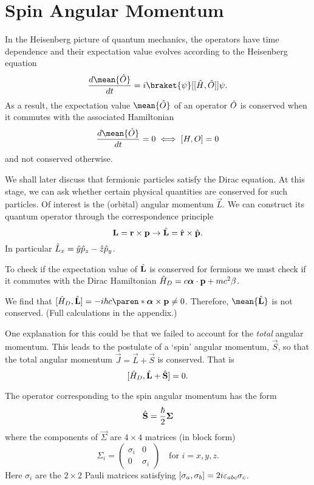 \documentclass[11pt]{penrose}
\begin{document}
\section{Spin Angular Momentum}
In the Heisenberg picture of quantum mechanics, the operators have time dependence and their expectation value evolves according to the Heisenberg equation
\begin{equation}
    \frac{d \mean{\qop{O}}}{dt} = i \braket{\psi}[\comm{\qop{H}, \qop{O}}]{\psi}.
\end{equation}
As a result, the expectation value $\mean{\qop{O}}$ of an operator $\hat{O}$ is conserved when it commutes with the associated Hamiltonian
\begin{equation}
    \frac{d \mean{\qop{O}}}{dt} = 0 \iff \comm{H, O} = 0
\end{equation}
and not conserved otherwise.

We shall later discuss that fermionic particles satisfy the Dirac equation. At this stage, we can ask whether certain physical quantities are conserved for such particles. Of interest is the (orbital) angular momentum $\vec{L}$. We can construct its quantum operator through the correspondence principle
\begin{equation}
    \boldsymbol{\mathbf{L}} = \boldsymbol{\mathbf{r}} \times \boldsymbol{\mathbf{p}} \to \hat{\boldsymbol{\mathbf{L}}} = \hat{\boldsymbol{\mathbf{r}}} \times \hat{\boldsymbol{\mathbf{p}}}.
\end{equation}
In particular $\hat{L}_x = \hat{y} \hat{p}_z - \hat{z} \hat{p}_y$.

To check if the expectation value of $\hat{\boldsymbol{\mathbf{L}}}$ is conserved for fermions we must check if it commutes with the Dirac Hamiltonian $\hat{H}_D = c \boldsymbol{\mathbf{\alpha}} \cdot \boldsymbol{\mathbf{p}} + m c^2 \beta$.

We find that $\comm{ \qop{H}_D, \qop{\vec{L}} } = -i \hbar c \paren*{\vec{\alpha} \times \vec{p}} \neq 0$. Therefore, $\mean{\qop{\vec{L}}}$ is not conserved. (Full calculations in the appendix.)

One explanation for this could be that we failed to account for the \emph{total} angular momentum. This leads to the postulate of a `spin' angular momentum, $\vec{S}$, so that the total angular momentum $\vec{J} = \vec{L} + \vec{S}$ is conserved. That is
\begin{equation}
    \lbrack\hat{H}_D, \hat{\boldsymbol{\mathbf{L}}} + \hat{\boldsymbol{\mathbf{S}}}\rbrack = 0.
\end{equation}

The operator corresponding to the spin angular momentum has the form
\begin{equation}
    \hat{\boldsymbol{\mathbf{S}}} = \frac{\hbar}{2} \boldsymbol{\mathbf{\Sigma}}
\end{equation}
where the components of $\vec{\Sigma}$ are $4\times4$ matrices (in block form) 
\begin{equation}
    \Sigma_i =
    \begin{pmatrix}
    \sigma_i & 0 \\ 0 & \sigma_i
    \end{pmatrix}
    \quad\text{for } i = x, y, z.
\end{equation}
Here $\sigma_i$ are the $2 \times 2$ Pauli matrices satisfying $\lbrack\sigma_a, \sigma_b\rbrack = 2i \varepsilon_{abc} \sigma_c$.
\end{document}
